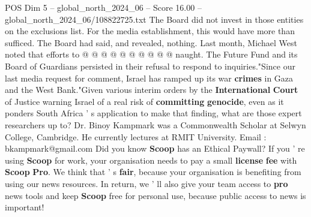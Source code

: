 \begin{textsample}{POS Dim 5 – global\_north\_2024\_06 – Score 16.00 – global\_north\_2024\_06/108822725.txt}
The Board did not invest in those entities on the exclusions list.
For the media establishment, this would have more than sufficed.
The Board had said, and revealed, nothing.
Last month, Michael West noted that efforts to @ @ @ @ @ @ @ @ @ @ naught.
The Future Fund and its Board of Guardians persisted in their refusal to respond to inquiries."Since our last media request for comment, Israel has ramped up its war \textbf{crimes} in Gaza and the West Bank."Given various interim orders by the \textbf{International} \textbf{Court} of Justice warning Israel of a real risk of \textbf{committing} \textbf{genocide}, even as it ponders South Africa ' s application to make that finding, what are those expert researchers up to?
Dr.
Binoy Kampmark was a Commonwealth Scholar at Selwyn College, Cambridge.
He currently lectures at RMIT University.
Email : bkampmark@gmail.com Did you know \textbf{Scoop} has an Ethical Paywall?
If you ' re using \textbf{Scoop} for work, your organisation needs to pay a small \textbf{license} \textbf{fee} with \textbf{Scoop} \textbf{Pro}.
We think that ' s \textbf{fair}, because your organisation is benefiting from using our news resources.
In return, we ' ll also give your team access to \textbf{pro} news tools and keep \textbf{Scoop} free for personal use, because public access to news is important!

\end{textsample}
